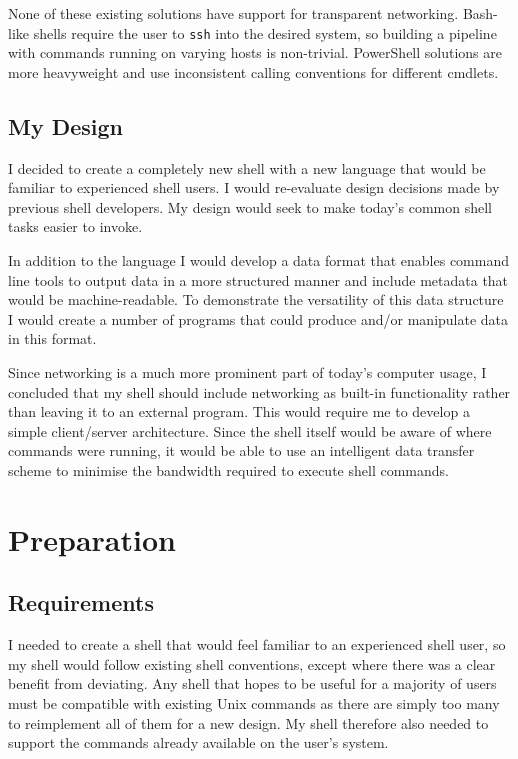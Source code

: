 \documentclass[12pt,twoside,notitlepage]{report}
\begin{document}
None of these existing solutions have support for transparent
networking. Bash-like shells require the user to {\tt ssh} into the
desired system, so building a pipeline with commands running on
varying hosts is non-trivial. PowerShell solutions are more
heavyweight and use inconsistent calling conventions for different
cmdlets.

\section{My Design}
I decided to create a completely new shell with a new
language that would be familiar to experienced shell users. I would
re-evaluate design decisions made by previous shell developers. My
design would seek to make today's common shell tasks easier to invoke.

In addition to the language I would develop a data format that enables
command line tools to output data in a more structured manner and
include metadata that would be machine-readable. To demonstrate the
versatility of this data structure I would create a number of programs
that could produce and/or manipulate data in this format.

Since networking is a much more prominent part of today's computer
usage, I concluded that my shell should include networking as built-in
functionality rather than leaving it to an external program. This
would require me to develop a simple client/server architecture. Since
the shell itself would be aware of where commands were running, it
would be able to use an intelligent data transfer scheme to minimise
the bandwidth required to execute shell commands.

\cleardoublepage

\chapter{Preparation}

\section{Requirements}
I needed to create a shell that would feel familiar to an experienced
shell user, so my shell would follow existing shell conventions,
except where there was a clear benefit from deviating. Any shell that
hopes to be useful for a majority of users must be compatible with
existing Unix commands as there are simply too many to reimplement all
of them for a new design. My shell therefore also needed to support
the commands already available on the user's system.
\end{document}
